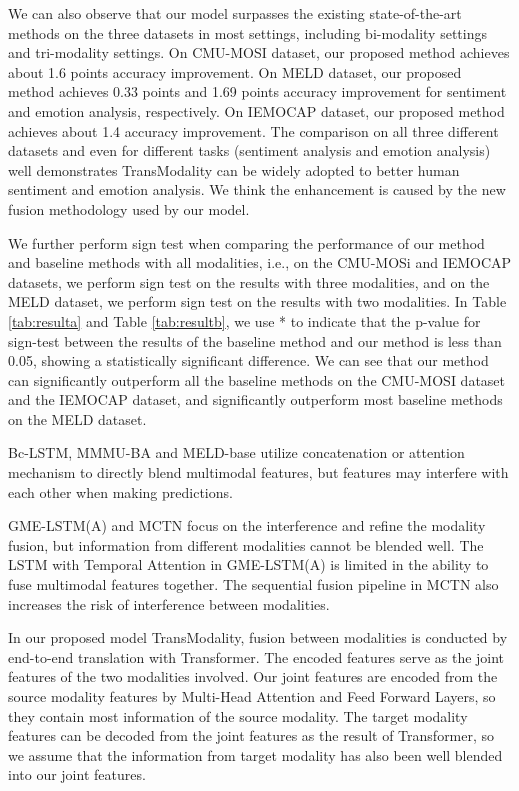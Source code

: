 \documentclass[sigconf]{acmart}
\begin{document}
	We can also observe that our model surpasses the existing state-of-the-art methods on the three datasets in most settings, including bi-modality settings and tri-modality settings. On CMU-MOSI dataset, our proposed method achieves about 1.6 points accuracy improvement. On MELD dataset, our proposed method achieves 0.33 points and 1.69 points accuracy improvement for sentiment and emotion analysis, respectively. On IEMOCAP dataset, our proposed method achieves about 1.4 accuracy improvement. The comparison on all three different datasets and even for different tasks (sentiment analysis and emotion analysis) well demonstrates TransModality can be widely adopted to better human sentiment and emotion analysis. We think the enhancement is caused by the new fusion methodology used by our model.
	
	We further perform sign test when comparing the performance of our method and baseline methods with all modalities, i.e., on the CMU-MOSi and IEMOCAP datasets, we perform sign test on the results with three modalities, and on the MELD dataset, we perform sign test on the results with two modalities. In Table \ref{tab:resulta} and Table \ref{tab:resultb}, we use * to indicate that the p-value for sign-test between the results of the baseline method and our method is less than 0.05, showing a statistically significant difference. We can see that our method can significantly outperform all the baseline methods on the CMU-MOSI dataset and the IEMOCAP dataset, and significantly outperform most baseline methods on the MELD dataset.
	
	Bc-LSTM, MMMU-BA and MELD-base utilize concatenation or attention mechanism to directly blend multimodal features, but features may interfere with each other when making predictions.
	
	GME-LSTM(A) and MCTN focus on the interference and refine the modality fusion, but information from different modalities cannot be blended well. The LSTM with Temporal Attention in GME-LSTM(A) is limited in the ability to fuse multimodal features together. The sequential fusion pipeline in MCTN also increases the risk of interference between modalities.
	
	In our proposed model TransModality, fusion between modalities is conducted by end-to-end translation with Transformer. The encoded features serve as the joint features of the two modalities involved. Our joint features are encoded from the source modality features by Multi-Head Attention and Feed Forward Layers, so they contain most information of the source modality. The target modality features can be decoded from the joint features as the result of Transformer, so we assume that the information from target modality has also been well blended into our joint features.
	
\end{document}
